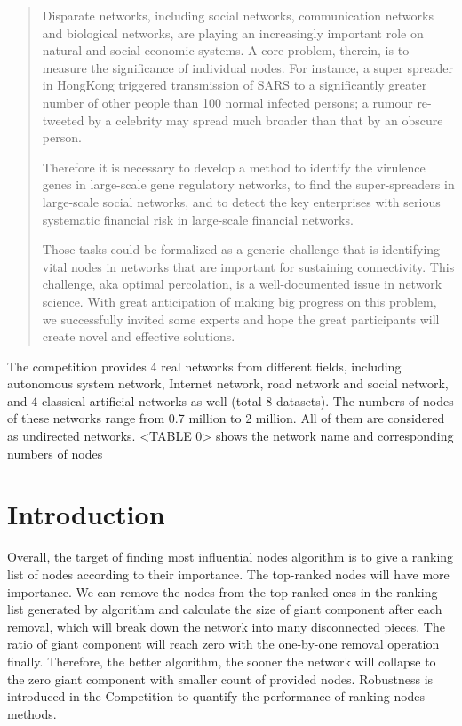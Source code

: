 \documentclass{article}
\newenvironment{itquote}
{\begin{quote}\itshape}
	{\end{quote}\ignorespacesafterend}
\begin{document}
	\begin{itquote}
		
		Disparate networks, including social networks, communication networks and biological networks, are playing an increasingly important role on natural and social-economic systems. A core problem, therein, is to measure the significance of individual nodes. For instance, a super spreader in HongKong triggered transmission of SARS to a significantly greater number of other people than 100 normal infected persons; a rumour re-tweeted by a celebrity may spread much broader than that by an obscure person.
		
		Therefore it is necessary to develop a method to identify the virulence genes in large-scale gene regulatory networks, to find the super-spreaders in large-scale social networks, and to detect the key enterprises with serious systematic financial risk in large-scale financial networks.
		
		Those tasks could be formalized as a generic challenge that is identifying vital nodes in networks that are important for sustaining connectivity. This challenge, aka optimal percolation, is a well-documented issue in network science. With great anticipation of making big progress on this problem, we successfully invited some experts and hope the great participants will create novel and effective solutions.  		
	\end{itquote}

	
	The competition provides 4 real networks from different fields, including autonomous system network, Internet network, road network and social network, and 4 classical artificial networks as well (total 8 datasets). The numbers of nodes of these networks range from 0.7 million to 2 million. All of them are considered as undirected networks. <TABLE 0> shows the network name and corresponding numbers of nodes 	
	

	\section{Introduction}


	Overall, the target of finding most influential nodes algorithm is to give a ranking list of nodes according to their importance. The top-ranked nodes will have more importance. We can remove the nodes from the top-ranked ones in the ranking list generated by algorithm and calculate the size of giant component after each removal, which will break down the network into many disconnected pieces. The ratio of giant component will reach zero with the one-by-one removal operation finally. Therefore, the better algorithm, the sooner the network will collapse to the zero giant component with smaller count of provided nodes. Robustness \cite{schneider2011mitigation} is introduced in the Competition to quantify the performance of ranking nodes methods. 
	
\end{document}
